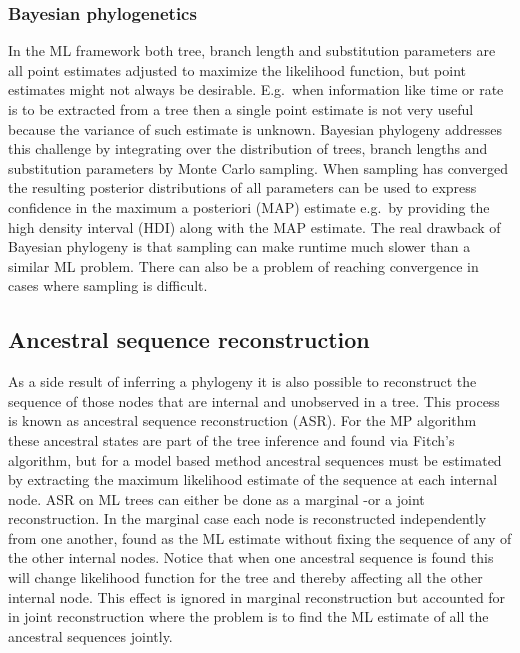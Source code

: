 \subsubsection{Bayesian phylogenetics}
In the ML framework both tree, branch length and substitution parameters are all point estimates adjusted to maximize the likelihood function, but point estimates might not always be desirable.
E.g.\ when information like time or rate is to be extracted from a tree then a single point estimate is not very useful because the variance of such estimate is unknown.
Bayesian phylogeny addresses this challenge by integrating over the distribution of trees, branch lengths and substitution parameters by Monte Carlo sampling.
When sampling has converged the resulting posterior distributions of all parameters can be used to express confidence in the maximum a posteriori (MAP) estimate e.g.\ by providing the high density interval (HDI) along with the MAP estimate.
The real drawback of Bayesian phylogeny is that sampling can make runtime much slower than a similar ML problem.
There can also be a problem of reaching convergence in cases where sampling is difficult.





\subsection{Ancestral sequence reconstruction}
As a side result of inferring a phylogeny it is also possible to reconstruct the sequence of those nodes that are internal and unobserved in a tree.
This process is known as ancestral sequence reconstruction (ASR).
For the MP algorithm these ancestral states are part of the tree inference and found via Fitch's algorithm, but for a model based method ancestral sequences must be estimated by extracting the maximum likelihood estimate of the sequence at each internal node.
ASR on ML trees can either be done as a marginal -or a joint reconstruction.
In the marginal case each node is reconstructed independently from one another, found as the ML estimate without fixing the sequence of any of the other internal nodes.
Notice that when one ancestral sequence is found this will change likelihood function for the tree and thereby affecting all the other internal node.
This effect is ignored in marginal reconstruction but accounted for in joint reconstruction where the problem is to find the ML estimate of all the ancestral sequences jointly.

